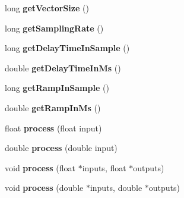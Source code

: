 \begin{DoxyCompactItemize}
\item 
\hypertarget{class_cicm_decorrelation_a9a4817b436eb65f5d2c1bcea30af2016}{long {\bfseries get\-Vector\-Size} ()}\label{class_cicm_decorrelation_a9a4817b436eb65f5d2c1bcea30af2016}

\item 
\hypertarget{class_cicm_decorrelation_af539688e08cec70f1f0f041aea66a692}{long {\bfseries get\-Sampling\-Rate} ()}\label{class_cicm_decorrelation_af539688e08cec70f1f0f041aea66a692}

\item 
\hypertarget{class_cicm_decorrelation_a4ac6f41a9b94229bf28a7c32df7111c3}{long {\bfseries get\-Delay\-Time\-In\-Sample} ()}\label{class_cicm_decorrelation_a4ac6f41a9b94229bf28a7c32df7111c3}

\item 
\hypertarget{class_cicm_decorrelation_a4d33e067c0adf29370fb818839b55a87}{double {\bfseries get\-Delay\-Time\-In\-Ms} ()}\label{class_cicm_decorrelation_a4d33e067c0adf29370fb818839b55a87}

\item 
\hypertarget{class_cicm_decorrelation_a6a58b23ad78d533fdb85e0fa7dda7711}{long {\bfseries get\-Ramp\-In\-Sample} ()}\label{class_cicm_decorrelation_a6a58b23ad78d533fdb85e0fa7dda7711}

\item 
\hypertarget{class_cicm_decorrelation_a1a3c22444879710fca142deae191779a}{double {\bfseries get\-Ramp\-In\-Ms} ()}\label{class_cicm_decorrelation_a1a3c22444879710fca142deae191779a}

\item 
\hypertarget{class_cicm_decorrelation_ad318d837001f353605d77a89fa4dadfe}{float {\bfseries process} (float input)}\label{class_cicm_decorrelation_ad318d837001f353605d77a89fa4dadfe}

\item 
\hypertarget{class_cicm_decorrelation_a0876b5c94aa2e3742bee42a928e64079}{double {\bfseries process} (double input)}\label{class_cicm_decorrelation_a0876b5c94aa2e3742bee42a928e64079}

\item 
\hypertarget{class_cicm_decorrelation_a6c67a2db9d7a991f2d7116bf3119d5f2}{void {\bfseries process} (float $\ast$inputs, float $\ast$outputs)}\label{class_cicm_decorrelation_a6c67a2db9d7a991f2d7116bf3119d5f2}

\item 
\hypertarget{class_cicm_decorrelation_a9ca5c0b58a69ea9714025b4ae525b408}{void {\bfseries process} (double $\ast$inputs, double $\ast$outputs)}\label{class_cicm_decorrelation_a9ca5c0b58a69ea9714025b4ae525b408}

\end{DoxyCompactItemize}

